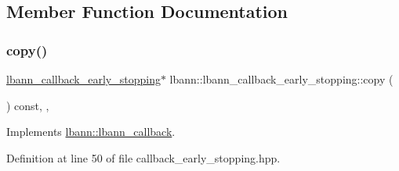 \subsection{Member Function Documentation}
\mbox{\label{classlbann_1_1lbann__callback__early__stopping_aa8e7bd4e9dde8e57dbc416dc75e25cc6}} 
\subsubsection{\texorpdfstring{copy()}{copy()}}
{\footnotesize\ttfamily \hyperlink{classlbann_1_1lbann__callback__early__stopping}{lbann\+\_\+callback\+\_\+early\+\_\+stopping}$\ast$ lbann\+::lbann\+\_\+callback\+\_\+early\+\_\+stopping\+::copy (\begin{DoxyParamCaption}{ }\end{DoxyParamCaption}) const\hspace{0.3cm}{\ttfamily [inline]}, {\ttfamily [override]}, {\ttfamily [virtual]}}



Implements \hyperlink{classlbann_1_1lbann__callback_a9f545d1269a8c7af335625d049691f26}{lbann\+::lbann\+\_\+callback}.



Definition at line 50 of file callback\+\_\+early\+\_\+stopping.\+hpp.


